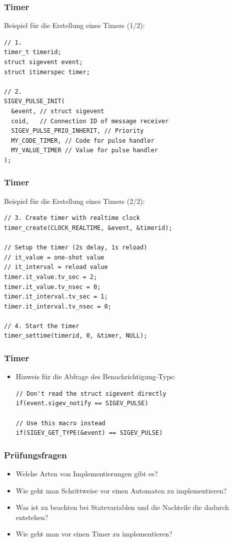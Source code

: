 \documentclass{beamer}
\begin{document}
\begin{frame}[fragile]
 \frametitle{Timer}
 Beispiel f\"ur die Erstellung eines Timers (1/2):
 \begin{lstlisting}
// 1.
timer_t timerid;
struct sigevent event;
struct itimerspec timer;

// 2.
SIGEV_PULSE_INIT(
  &event, // struct sigevent
  coid,   // Connection ID of message receiver
  SIGEV_PULSE_PRIO_INHERIT, // Priority
  MY_CODE_TIMER, // Code for pulse handler
  MY_VALUE_TIMER // Value for pulse handler
);
 \end{lstlisting}
\end{frame}

\begin{frame}[fragile]
 \frametitle{Timer}
 Beispiel f\"ur die Erstellung eines Timers (2/2):
 \begin{lstlisting}
// 3. Create timer with realtime clock
timer_create(CLOCK_REALTIME, &event, &timerid);

// Setup the timer (2s delay, 1s reload)
// it_value = one-shot value
// it_interval = reload value
timer.it_value.tv_sec = 2;
timer.it_value.tv_nsec = 0;
timer.it_interval.tv_sec = 1;
timer.it_interval.tv_nsec = 0;

// 4. Start the timer
timer_settime(timerid, 0, &timer, NULL);
 \end{lstlisting}
\end{frame}

\begin{frame}[fragile]
 \frametitle{Timer}
 \begin{itemize}
  \item Hinweis f\"ur die Abfrage des Benachrichtigung-Typs:\newline
  \begin{lstlisting}
// Don't read the struct sigevent directly
if(event.sigev_notify == SIGEV_PULSE)

// Use this macro instead
if(SIGEV_GET_TYPE(&event) == SIGEV_PULSE)
  \end{lstlisting}
 \end{itemize}
\end{frame}

\begin{frame}
 \frametitle{Pr\"ufungsfragen}
 \begin{itemize}
  \item Welche Arten von Implementierungen gibt es?
  \item Wie geht man Schrittweise vor einen Automaten zu implementieren?
  \item Was ist zu beachten bei Statevariablen und die Nachteile die dadurch entstehen?
  \item Wie geht man vor einen Timer zu implementieren?
 \end{itemize}
\end{frame}
\end{document}
